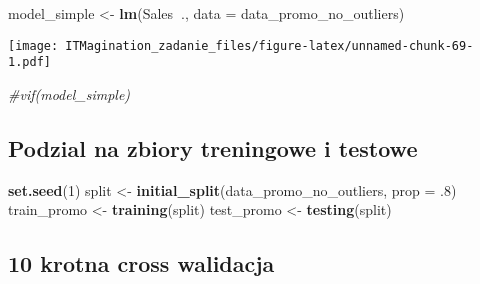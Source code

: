 \documentclass[]{article}
\newenvironment{Shaded}{\begin{snugshade}}{\end{snugshade}}
\newcommand{\CommentTok}[1]{\textcolor[rgb]{0.56,0.35,0.01}{\textit{#1}}}
\newcommand{\DataTypeTok}[1]{\textcolor[rgb]{0.13,0.29,0.53}{#1}}
\newcommand{\DecValTok}[1]{\textcolor[rgb]{0.00,0.00,0.81}{#1}}
\newcommand{\FloatTok}[1]{\textcolor[rgb]{0.00,0.00,0.81}{#1}}
\newcommand{\KeywordTok}[1]{\textcolor[rgb]{0.13,0.29,0.53}{\textbf{#1}}}
\newcommand{\NormalTok}[1]{#1}
\newcommand{\OperatorTok}[1]{\textcolor[rgb]{0.81,0.36,0.00}{\textbf{#1}}}
\newcommand{\StringTok}[1]{\textcolor[rgb]{0.31,0.60,0.02}{#1}}
\begin{document}
\begin{Shaded}
\begin{Highlighting}[]
\NormalTok{model_simple <-}\StringTok{ }\KeywordTok{lm}\NormalTok{(Sales}\OperatorTok{~}\NormalTok{., }\DataTypeTok{data =}\NormalTok{ data_promo_no_outliers)}
\end{Highlighting}
\end{Shaded}

\begin{Shaded}
\end{Shaded}

\texttt{[image: ITMagination\_zadanie\_files/figure-latex/unnamed-chunk-69-1.pdf]}

\begin{Shaded}
\begin{Highlighting}[]
\CommentTok{#vif(model_simple)}
\end{Highlighting}
\end{Shaded}

\hypertarget{podzial-na-zbiory-treningowe-i-testowe-1}{%
\subsection{Podzial na zbiory treningowe i
testowe}\label{podzial-na-zbiory-treningowe-i-testowe-1}}

\begin{Shaded}
\begin{Highlighting}[]
\KeywordTok{set.seed}\NormalTok{(}\DecValTok{1}\NormalTok{)}
\NormalTok{split <-}\StringTok{ }\KeywordTok{initial_split}\NormalTok{(data_promo_no_outliers, }\DataTypeTok{prop =} \FloatTok{.8}\NormalTok{)}
\NormalTok{train_promo <-}\StringTok{ }\KeywordTok{training}\NormalTok{(split)}
\NormalTok{test_promo <-}\StringTok{ }\KeywordTok{testing}\NormalTok{(split)}
\end{Highlighting}
\end{Shaded}

\hypertarget{krotna-cross-walidacja-1}{%
\subsection{10 krotna cross walidacja}\label{krotna-cross-walidacja-1}}
\end{document}
